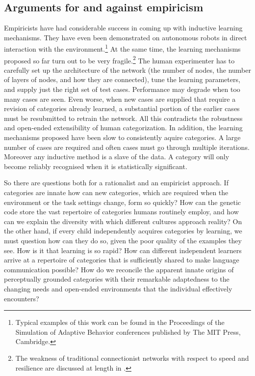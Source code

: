 \subsection{Arguments for and against empiricism}

Empiricists have had considerable
success in coming up with inductive learning mechanisms. 
They have even been demonstrated on autonomous robots 
in direct interaction with the environment.\footnote{
Typical examples of this work can be found in the 
Proceedings of the Simulation of Adaptive Behavior 
conferences published by The MIT Press, Cambridge.}
At the same time, the learning mechanisms proposed so far turn out
to be very fragile.\footnote{
The weakness of traditional connectionist networks
with respect to speed and resilience
are discussed at length in \cite{Quartz:1997}.}
The human experimenter has to carefully 
set up the architecture of the network (the number of
nodes, the number of layers of nodes, and how they are
connected), tune the learning
parameters, and supply just the right set of test cases. 
Performance may degrade when too many cases are seen. 
Even worse, when new cases are supplied that require
a revision of categories already learned, a substantial
portion of the earlier cases must be resubmitted to 
retrain the network. All this contradicts
the robustness and open-ended extensibility
of human categorization. In addition, 
the learning mechanisms proposed have been
slow to consistently aquire categories. A large number of cases
are required and often 
cases must go through multiple iterations. Moreover 
any inductive method is a slave of
the data. A category will only become reliably recognised
when it is statistically significant. 

So there are questions both for a rationalist and an 
empiricist approach. If categories are innate how can
new categories, which are required when the environment
or the task settings change, form so quickly?
How can the genetic code store the vast repertoire 
of categories humans routinely 
employ, and how can we explain the diversity with which different
cultures approach reality? On the other hand, if every 
child independently acquires categories by learning, we 
must question how 
can they do so, given the poor quality of the examples 
they see. How is it that learning is so rapid? How can different
independent learners arrive at a repertoire of categories
that is sufficiently shared to make language communication
possible? How do we reconcile the apparent 
innate origins of perceptually 
grounded categories with their remarkable adaptedness to the 
changing needs and open-ended environments that the individual
effectively encounters? 

